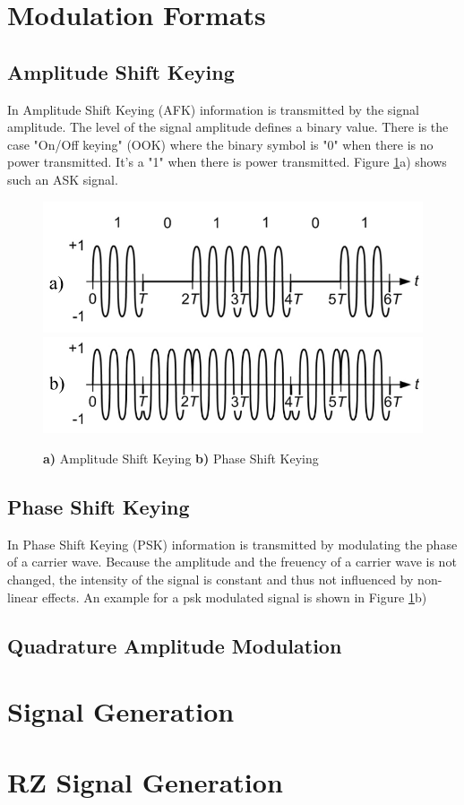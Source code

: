 \section{Modulation Formats}
\subsection{Amplitude Shift Keying}
In Amplitude Shift Keying (AFK) information is transmitted by the signal amplitude. The level of the signal amplitude defines a binary value. There is the case "On/Off keying" (OOK) where the binary symbol is "0" when there is no power transmitted. It's a "1" when there is power transmitted. 
Figure \ref{fig:ask}a) shows such an ASK signal.

\begin{figure}
  \centering
  \includegraphics[width=.5\columnwidth]{Grafiken/OOK.jpg}
	\includegraphics[width=.5\columnwidth]{Grafiken/PSK.jpg}%
\caption{\textbf{a)} Amplitude Shift Keying \textbf{b)} Phase Shift Keying}
\label{fig:ask}
\end{figure}



\subsection{Phase Shift Keying}
In Phase Shift Keying (PSK) information is transmitted by modulating the phase of a carrier wave. Because the amplitude and the freuency of a carrier wave is not changed, the intensity of the signal is constant and thus not influenced by non-linear effects. An example for a psk modulated signal is shown in Figure \ref{fig:ask}b)
\subsection{Quadrature Amplitude Modulation}


\section{Signal Generation}


\section{RZ Signal Generation}